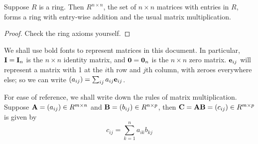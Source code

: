 \begin{proposition}
    Suppose \(R\) is a ring.
    Then \(R^{n \times n}\),
    the set of \(n \times n\) matrices with entries in \(R\),
    forms a ring with entry-wise addition
    and the usual matrix multiplication.
\end{proposition}
\begin{proof}
    Check the ring axioms yourself.
\end{proof}
\begin{remark}
    We shall use bold fonts to represent matrices in this document.
    In particular, \(\vb{I} = \vb{I}_n\)
    is the \(n \times n\) identity matrix,
    and \(\vb{0} = \vb{0}_n\) is the \(n \times n\) zero matrix.
    \(\vb{e}_{ij}\) will represent a matrix
    with 1 at the \(i\)th row and \(j\)th column,
    with zeroes everywhere else;
    so we can write \((a_{ij}) = \sum_{ij} a_{ij}\vb{e}_{ij}\).
\end{remark}
\begin{remark}\label{rem:matrix-mult}
    For ease of reference,
    we shall write down the rules of matrix multiplication.
    Suppose \(\vb{A} = (a_{ij}) \in R^{m \times n}\)
    and \(\vb{B} = (b_{ij}) \in R^{n \times p}\),
    then \(\vb{C} = \vb{A}\vb{B} = (c_{ij}) \in R^{m \times p}\)
    is given by
    \begin{equation*}
        c_{ij} = \sum_{k=1}^n a_{ik}b_{kj}
    \end{equation*}
\end{remark}

